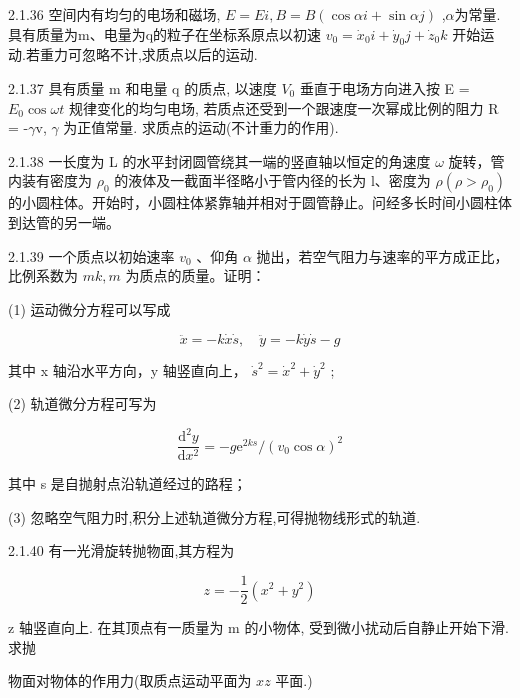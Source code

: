 \begin{problem}{2.1.36}
空间内有均匀的电场和磁场, $E=Ei,B=B(\cos\alpha i+\sin\alpha j)$ ,$\alpha$为常量.具有质量为m、电量为q的粒子在坐标系原点以初速 $v_{0}=\dot{x}_{0}i+\dot{y}_{0}j+\dot{z}_{0}k$ 开始运动.若重力可忽略不计,求质点以后的运动.
\end{problem}
\clearpage


\begin{problem}{2.1.37}
具有质量 m 和电量 q 的质点, 以速度 $V_{0}$ 垂直于电场方向进入按 E = $E_{0}\cos\omega t$ 规律变化的均匀电场, 若质点还受到一个跟速度一次幂成比例的阻力 R = -$\gamma$v, $\gamma$ 为正值常量. 求质点的运动(不计重力的作用).
\end{problem}
\clearpage


\begin{problem}{2.1.38}
一长度为 L 的水平封闭圆管绕其一端的竖直轴以恒定的角速度 $\omega$ 旋转，管内装有密度为 $\rho_{0}$ 的液体及一截面半径略小于管内径的长为 l、密度为 $\rho(\rho > \rho_{0})$ 的小圆柱体。开始时，小圆柱体紧靠轴并相对于圆管静止。问经多长时间小圆柱体到达管的另一端。
\end{problem}
\clearpage


\begin{problem}{2.1.39}
一个质点以初始速率 $v_{0}$ 、仰角 $\alpha$ 抛出，若空气阻力与速率的平方成正比，比例系数为 $mk, m$ 为质点的质量。证明：

(1) 运动微分方程可以写成

\[
\ddot {x} = - k \dot {x} \dot {s}, \quad \ddot {y} = - k \dot {y} \dot {s} - g
\]

其中 x 轴沿水平方向，y 轴竖直向上， $\dot{s}^{2}=\dot{x}^{2}+\dot{y}^{2}$ ;

(2) 轨道微分方程可写为

\[
\frac {\mathrm{d} ^ {2} y}{\mathrm{d} x ^ {2}} = - g \mathrm{e} ^ {2 k s} / (v _ {0} \cos \alpha) ^ {2}
\]

其中 s 是自抛射点沿轨道经过的路程；

(3) 忽略空气阻力时,积分上述轨道微分方程,可得抛物线形式的轨道.
\end{problem}
\clearpage


\begin{problem}{2.1.40}
有一光滑旋转抛物面,其方程为

\[
z = - \frac {1}{2} (x ^ {2} + y ^ {2})
\]

z 轴竖直向上. 在其顶点有一质量为 m 的小物体, 受到微小扰动后自静止开始下滑. 求抛

物面对物体的作用力(取质点运动平面为 $xz$ 平面.)
\end{problem}
\clearpage


